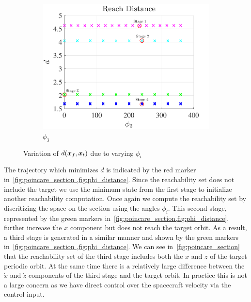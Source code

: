\documentclass[]{aiaa-tc}%
\begin{document}
\begin{figure}[htbp]
    \begin{subfigure}[htbp]{0.3\textwidth} 
        \includegraphics[width=\textwidth]{figures/phi3.pdf} 
        \caption{\( \phi_3 \)} \label{fig:phi3} 
    \end{subfigure} 
    \caption{Variation of \(d(\bm{x}_f,\bm{x}_t)\) due to varying \( \phi_i\)}
    \label{fig:phi_distance} 
\end{figure}

The trajectory which minimizes \( d \) is indicated by the red marker in~\cref{fig:poincare_section ,fig:phi_distance}.
Since the reachability set does not include the target we use the minimum state from the first stage to initialize another reachability computation.
Once again we compute the reachability set by discritizing the space on the \Poincare section using the angles \( \phi_i \).
This second stage, represented by the green markers in~\cref{fig:poincare_section,fig:phi_distance}, further increase the \( x \) component but does not reach the target orbit.
As a result, a third stage is generated in a similar manner and shown by the green markers in~\cref{fig:poincare_section ,fig:phi_distance}.
We can see in~\cref{fig:poincare_section} that the reachability set of the third stage includes both the \( x \) and \( z\) of the target periodic orbit.
At the same time there is a relatively large difference between the \( \dot{x} \) and \( \dot{z} \) components of the third stage and the target orbit.
In practice this is not a large concern as we have direct control over the spacecraft velocity via the control input.
\end{document}
